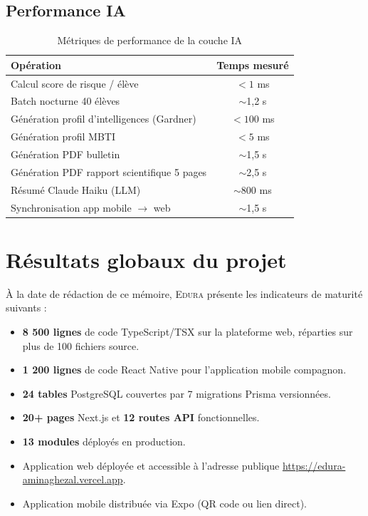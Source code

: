 \documentclass[12pt,a4paper,oneside]{report}
\newcommand{\edura}{\textsc{Edura}}
\begin{document}
\subsection{Performance IA}

\begin{table}[H]
\centering
\caption{Métriques de performance de la couche IA}
\label{tab:perf_ia}
\begin{tabular}{lc}
\toprule
\textbf{Opération} & \textbf{Temps mesuré} \\
\midrule
Calcul score de risque / élève & $< 1$ ms \\
Batch nocturne 40 élèves & $\sim$1,2 s \\
Génération profil d'intelligences (Gardner) & $< 100$ ms \\
Génération profil MBTI & $< 5$ ms \\
Génération PDF bulletin & $\sim$1,5 s \\
Génération PDF rapport scientifique 5 pages & $\sim$2,5 s \\
Résumé Claude Haiku (LLM) & $\sim$800 ms \\
Synchronisation app mobile $\to$ web & $\sim$1,5 s \\
\bottomrule
\end{tabular}
\end{table}

\section{Résultats globaux du projet}

À la date de rédaction de ce mémoire, \edura{} présente les indicateurs de maturité suivants :

\begin{itemize}
  \item \textbf{8 500 lignes} de code TypeScript/TSX sur la plateforme web, réparties sur plus de 100 fichiers source.
  \item \textbf{1 200 lignes} de code React Native pour l'application mobile compagnon.
  \item \textbf{24 tables} PostgreSQL couvertes par 7 migrations Prisma versionnées.
  \item \textbf{20+ pages} Next.js et \textbf{12 routes API} fonctionnelles.
  \item \textbf{13 modules} déployés en production.
  \item Application web déployée et accessible à l'adresse publique \url{https://edura-aminaghezal.vercel.app}.
  \item Application mobile distribuée via Expo (QR code ou lien direct).
\end{itemize}
\end{document}
